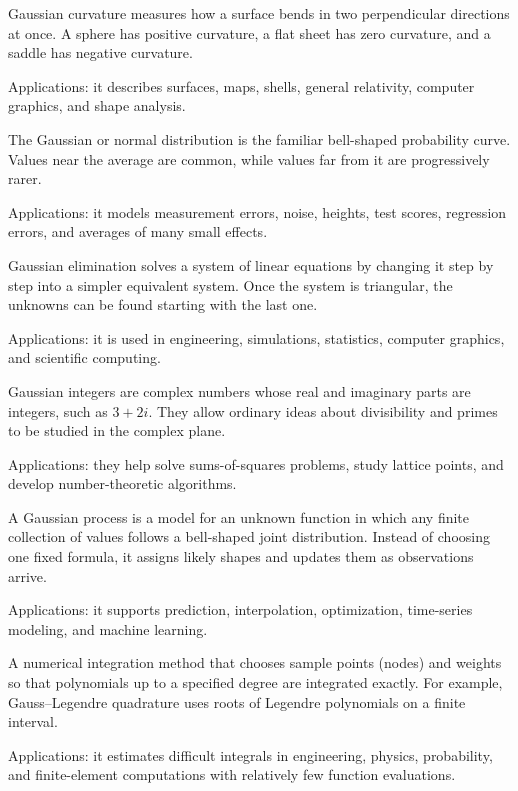 Gaussian curvature measures how a surface bends in two perpendicular directions at once. A sphere has positive curvature, a flat sheet has zero curvature, and a saddle has negative curvature. \par\noindent Applications: it describes surfaces, maps, shells, general relativity, computer graphics, and shape analysis.

The Gaussian or normal distribution is the familiar bell-shaped probability curve. Values near the average are common, while values far from it are progressively rarer. \par\noindent Applications: it models measurement errors, noise, heights, test scores, regression errors, and averages of many small effects.

Gaussian elimination solves a system of linear equations by changing it step by step into a simpler equivalent system. Once the system is triangular, the unknowns can be found starting with the last one. \par\noindent Applications: it is used in engineering, simulations, statistics, computer graphics, and scientific computing.

Gaussian integers are complex numbers whose real and imaginary parts are integers, such as $3+2i$. They allow ordinary ideas about divisibility and primes to be studied in the complex plane. \par\noindent Applications: they help solve sums-of-squares problems, study lattice points, and develop number-theoretic algorithms.

A Gaussian process is a model for an unknown function in which any finite collection of values follows a bell-shaped joint distribution. Instead of choosing one fixed formula, it assigns likely shapes and updates them as observations arrive. \par\noindent Applications: it supports prediction, interpolation, optimization, time-series modeling, and machine learning.

A numerical integration method that chooses sample points (nodes) and weights so that polynomials up to a specified degree are integrated exactly. For example, Gauss--Legendre quadrature uses roots of Legendre polynomials on a finite interval. \par\noindent Applications: it estimates difficult integrals in engineering, physics, probability, and finite-element computations with relatively few function evaluations.

